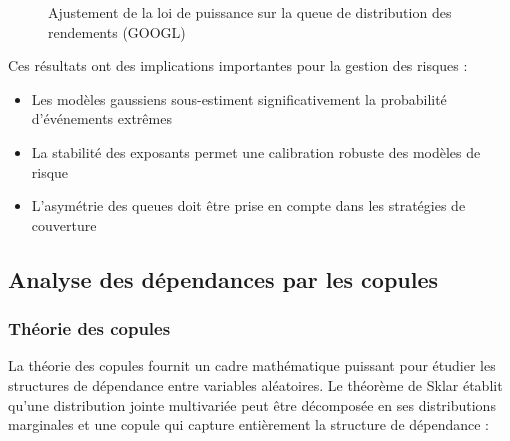 \documentclass[12pt,a4paper]{article}
\theoremstyle{definition}
\theoremstyle{remark}
\begin{document}
\begin{figure}[h!]
\centering
{}
\caption{Ajustement de la loi de puissance sur la queue de distribution des rendements (GOOGL)}
\end{figure}

Ces résultats ont des implications importantes pour la gestion des risques :

\begin{itemize}
    \item Les modèles gaussiens sous-estiment significativement la probabilité d'événements extrêmes
    \item La stabilité des exposants permet une calibration robuste des modèles de risque
    \item L'asymétrie des queues doit être prise en compte dans les stratégies de couverture
\end{itemize}

\subsection{Analyse des dépendances par les copules}

\subsubsection{Théorie des copules}

La théorie des copules fournit un cadre mathématique puissant pour étudier les structures de dépendance entre variables aléatoires. Le théorème de Sklar établit qu'une distribution jointe multivariée peut être décomposée en ses distributions marginales et une copule qui capture entièrement la structure de dépendance :
\end{document}
